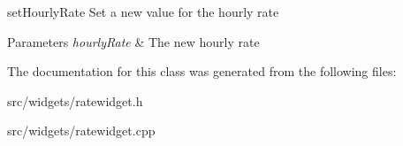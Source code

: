 set\+Hourly\+Rate Set a new value for the hourly rate 


\begin{DoxyParams}{Parameters}
{\em hourly\+Rate} & The new hourly rate \\
\hline
\end{DoxyParams}


The documentation for this class was generated from the following files\+:\begin{DoxyCompactItemize}
\item 
src/widgets/ratewidget.\+h\item 
src/widgets/ratewidget.\+cpp\end{DoxyCompactItemize}
